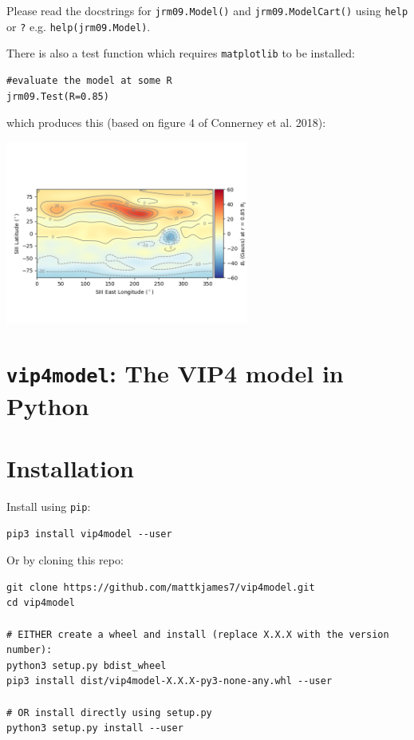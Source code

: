 	
	Please read the docstrings for \texttt{jrm09.Model()} and \texttt{jrm09.ModelCart()} using \texttt{help} or \texttt{?} e.g. \texttt{help(jrm09.Model)}.
	
	There is also a test function which requires \texttt{matplotlib} to be installed:
	
	\begin{verbatim}
#evaluate the model at some R
jrm09.Test(R=0.85)
	\end{verbatim}
	
	which produces this (based on figure 4 of Connerney et al. 2018):
	
	\begin{center}
		\includegraphics[width=0.6\textwidth]{figures/ch3_jrm09test.png}
	\end{center}


	\section{\texttt{vip4model}: The VIP4 model in Python}
	
	\section{Installation}

Install using \texttt{pip}:

\begin{verbatim}
pip3 install vip4model --user
\end{verbatim}

Or by cloning this repo:

\begin{verbatim}
git clone https://github.com/mattkjames7/vip4model.git
cd vip4model

# EITHER create a wheel and install (replace X.X.X with the version number):
python3 setup.py bdist_wheel
pip3 install dist/vip4model-X.X.X-py3-none-any.whl --user

# OR install directly using setup.py
python3 setup.py install --user
\end{verbatim}

